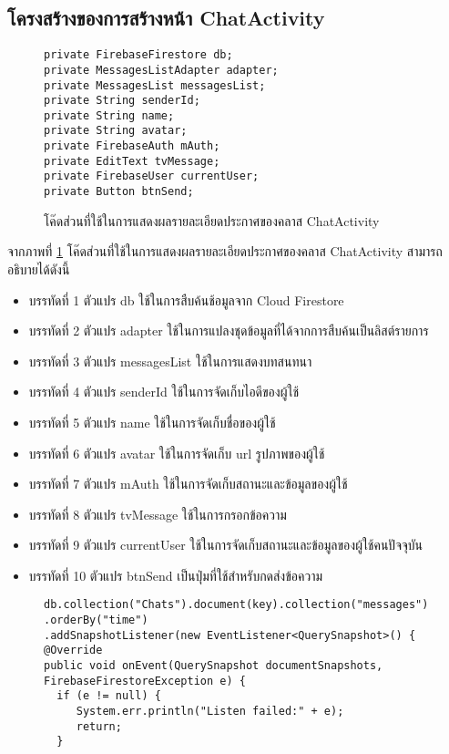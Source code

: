 {	\subsection{โครงสร้างของการสร้างหน้า ChatActivity}
	\begin{figure}[H]
		{\begin{lstlisting}
private FirebaseFirestore db;
private MessagesListAdapter adapter;
private MessagesList messagesList;
private String senderId;
private String name;
private String avatar;
private FirebaseAuth mAuth;
private EditText tvMessage;
private FirebaseUser currentUser;
private Button btnSend;
			\end{lstlisting}}
		\caption{โค๊ดส่วนที่ใช้ในการแสดงผลรายละเอียดประกาศของคลาส ChatActivity}
		\label{Fig:ChatActivity}
	\end{figure}
	จากภาพที่ \ref{Fig:ChatActivity} โค๊ดส่วนที่ใช้ในการแสดงผลรายละเอียดประกาศของคลาส ChatActivity สามารถอธิบายได้ดังนี้
	\begin{itemize}[label={--}]
		\item บรรทัดที่ 1 ตัวแปร db ใช้ในการสืบค้นช้อมูลจาก Cloud Firestore
		\item บรรทัดที่ 2 ตัวแปร adapter ใช้ในการแปลงชุดข้อมูลที่ได้จากการสืบค้นเป็นลิสต์รายการ
		\item บรรทัดที่ 3 ตัวแปร messagesList ใช้ในการแสดงบทสนทนา
		\item บรรทัดที่ 4 ตัวแปร senderId ใช้ในการจัดเก็บไอดีของผู้ใช้
		\item บรรทัดที่ 5 ตัวแปร name ใช้ในการจัดเก็บชื่อของผู้ใช้
		\item บรรทัดที่ 6 ตัวแปร avatar ใช้ในการจัดเก็บ url รูปภาพของผู้ใช้
		\item บรรทัดที่ 7 ตัวแปร mAuth ใช้ในการจัดเก็บสถานะและข้อมูลของผู้ใช้
		\item บรรทัดที่ 8 ตัวแปร tvMessage ใช้ในการกรอกข้อความ
		\item บรรทัดที่ 9 ตัวแปร currentUser ใช้ในการจัดเก็บสถานะและข้อมูลของผู้ใช้คนปัจจุบัน
		\item บรรทัดที่ 10 ตัวแปร btnSend เป็นปุ่มที่ใช้สำหรับกดส่งข้อความ
	\end{itemize}
	\begin{figure}[H]
		{\begin{lstlisting}
db.collection("Chats").document(key).collection("messages")
.orderBy("time")
.addSnapshotListener(new EventListener<QuerySnapshot>() {
@Override
public void onEvent(QuerySnapshot documentSnapshots, FirebaseFirestoreException e) {
  if (e != null) {
     System.err.println("Listen failed:" + e);
     return;
  }


\end{lstlisting}}
\end{figure}}
